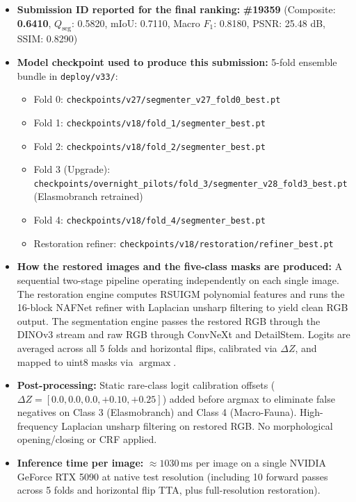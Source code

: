 \documentclass{article}
\begin{document}
\begin{itemize}[leftmargin=*]
\item \textbf{Submission ID reported for the final ranking:} \textbf{\#19359} (Composite: \textbf{0.6410}, $Q_{\text{seg}}$: 0.5820, mIoU: 0.7110, Macro $F_1$: 0.8180, PSNR: 25.48 dB, SSIM: 0.8290)
\item \textbf{Model checkpoint used to produce this submission:} 5-fold ensemble bundle in \texttt{deploy/v33/}:
  \begin{itemize}
    \item Fold 0: \texttt{checkpoints/v27/segmenter\_v27\_fold0\_best.pt}
    \item Fold 1: \texttt{checkpoints/v18/fold\_1/segmenter\_best.pt}
    \item Fold 2: \texttt{checkpoints/v18/fold\_2/segmenter\_best.pt}
    \item Fold 3 (Upgrade): \texttt{checkpoints/overnight\_pilots/fold\_3/segmenter\_v28\_fold3\_best.pt} (Elasmobranch retrained)
    \item Fold 4: \texttt{checkpoints/v18/fold\_4/segmenter\_best.pt}
    \item Restoration refiner: \texttt{checkpoints/v18/restoration/refiner\_best.pt}
  \end{itemize}
\item \textbf{How the restored images and the five-class masks are produced:} A sequential two-stage pipeline operating independently on each single image. The restoration engine computes RSUIGM polynomial features and runs the 16-block NAFNet refiner with Laplacian unsharp filtering to yield clean RGB output. The segmentation engine passes the restored RGB through the DINOv3 stream and raw RGB through ConvNeXt and DetailStem. Logits are averaged across all 5 folds and horizontal flips, calibrated via $\Delta Z$, and mapped to uint8 masks via $\operatorname{argmax}$.
\item \textbf{Post-processing:} Static rare-class logit calibration offsets ($\Delta Z = [0.0, 0.0, 0.0, +0.10, +0.25]$) added before argmax to eliminate false negatives on Class 3 (Elasmobranch) and Class 4 (Macro-Fauna). High-frequency Laplacian unsharp filtering on restored RGB. No morphological opening/closing or CRF applied.
\item \textbf{Inference time per image:} $\approx 1030$\,ms per image on a single NVIDIA GeForce RTX 5090 at native test resolution (including 10 forward passes across 5 folds and horizontal flip TTA, plus full-resolution restoration).
\end{itemize}
\end{document}
